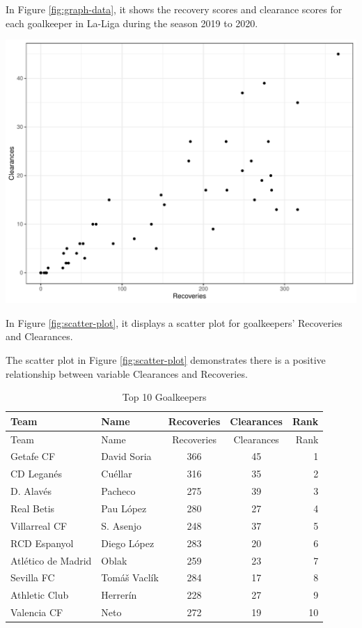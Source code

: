 \documentclass[11pt,a4paper,]{article}
\let\origfigure\figure
\let\endorigfigure\endfigure
\renewenvironment{figure}[1][2] {
    \expandafter\origfigure\expandafter[H]
} {
    \endorigfigure
}
\begin{document}
In Figure \ref{fig:graph-data}, it shows the recovery scores and clearance scores for each goalkeeper in La-Liga during the season 2019 to 2020.

\begin{figure}[H]

{\centering \includegraphics[width=0.8\linewidth]{Assignment-4-ETC5513_files/figure-latex/scatter-plot-1} 

}

\caption{Scatter plot for Recoveries and Clearances}\label{fig:scatter-plot}
\end{figure}

In Figure \ref{fig:scatter-plot}, it displays a scatter plot for goalkeepers' Recoveries and Clearances.

The scatter plot in Figure \ref{fig:scatter-plot} demonstrates there is a positive relationship between variable Clearances and Recoveries.

\begin{longtable}[]{@{}llccr@{}}
\caption{\label{tab:goal-data1}Top 10 Goalkeepers}\tabularnewline
\toprule
Team & Name & Recoveries & Clearances & Rank \\
\midrule
\endfirsthead
\toprule
Team & Name & Recoveries & Clearances & Rank \\
\midrule
\endhead
Getafe CF & David Soria & 366 & 45 & 1 \\
CD Leganés & Cuéllar & 316 & 35 & 2 \\
D. Alavés & Pacheco & 275 & 39 & 3 \\
Real Betis & Pau López & 280 & 27 & 4 \\
Villarreal CF & S. Asenjo & 248 & 37 & 5 \\
RCD Espanyol & Diego López & 283 & 20 & 6 \\
Atlético de Madrid & Oblak & 259 & 23 & 7 \\
Sevilla FC & Tomáš Vaclík & 284 & 17 & 8 \\
Athletic Club & Herrerín & 228 & 27 & 9 \\
Valencia CF & Neto & 272 & 19 & 10 \\
\bottomrule
\end{longtable}
\end{document}
